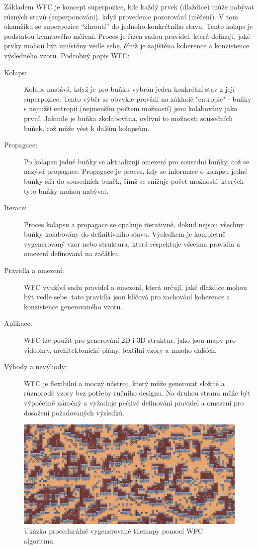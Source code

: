 Základem WFC je koncept superpozice, kde každý prvek (dlaždice) může nabývat různých stavů (superponováni). když provedeme pozorování (měření). V tom okamžiku se superpozice “zhroutí” do jednoho konkrétního stavu. Tento kolaps je podstatou kvantového měření. Proces je řízen sadou pravidel, která definují, jaké prvky mohou být umístěny vedle sebe, čímž je zajištěna koherence a konzistence výsledného vzoru. Podrobný popis WFC:

\begin{description}
	\item [Kolaps:] Kolaps nastává, když je pro buňku vybrán jeden konkrétní stav z její superpozice. Tento výběr se obvykle provádí na základě "entropie" - buňky s nejnižší entropií (nejmenším počtem možností) jsou kolabovány jako první. Jakmile je buňka zkolabována, ovlivní to možnosti sousedních buňek, což může vést k dalším kolapsům.
	\item [Propagace:] Po kolapsu jedné buňky se aktualizují omezení pro sousední buňky, což se nazývá propagace. Propagace je proces, kdy se informace o kolapsu jedné buňky šíří do sousedních buněk, šímž se snižuje počet možností, kterých tyto buňky mohou nabývat.
	\item [Iterace:] Proces kolapsu a propagace se opakuje iterativně, dokud nejsou všechny buňky kolabovány do definitivního stavu. Výsledkem je kompletně vygenerovaný vzor nebo struktura, která respektuje všechna pravidla a omezení definovaná na začátku.
	\item [Pravidla a omezení:] WFC využívá sadu pravidel a omezení, která určují, jaké dlaždice mohou být vedle sebe. tato pravidla jsou klíčová pro zachování koherence a konzistence generovaného vzoru.
	\item [Aplikace:] WFC lze použít pro generování 2D i 3D struktur, jako jsou mapy pro videohry, architektonické plány, textilní vzory a mnoho dalších.
	\item [Výhody a nevýhody:] WFC je flexibilní a mocný nástroj, který může generovat složité a různorodé vzory bez potřeby ručního designu. Na druhou stranu může být výpočetně náročný a vyžaduje pečlivé definování pravidel a omezení pro dosažení požadovaných výsledků.
\end{description}

\begin{figure}[H]
	\centering
	\includegraphics[scale=0.45]{obrazky-figures/WFCGenerated.png}
	\caption{Ukázka procedurálně vygenerované tilemapy pomocí WFC algoritmu.}
	\label{WFCMap}
\end{figure}

